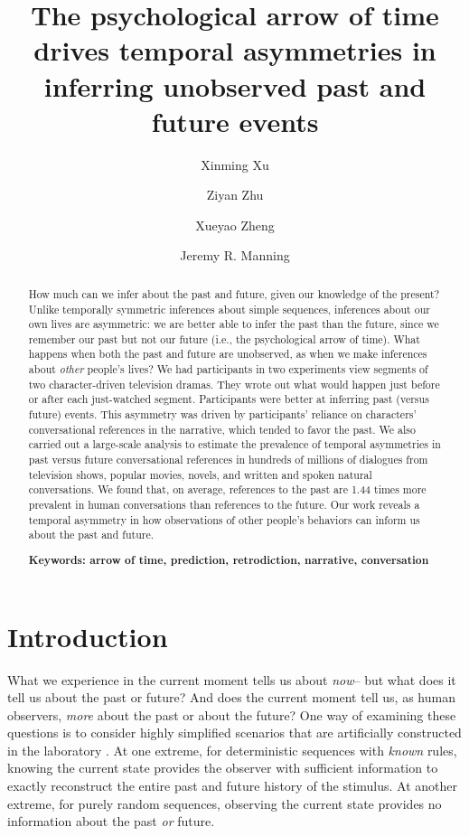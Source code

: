 \documentclass[10pt]{article}
\title{\Large The psychological arrow of time drives temporal asymmetries in inferring unobserved past and future events}
\author[1]{Xinming Xu}
\author[2]{Ziyan Zhu}
\author[3]{Xueyao Zheng}
\author[1, $\star$]{Jeremy R. Manning}
\affil[1]{Dartmouth College, Hanover, NH, USA}
\affil[2]{Peking University, Beijing, China}
\affil[3]{Beijing Normal University, Beijing, China}
\affil[$\star$]{Address correspondence to jeremy.r.manning@dartmouth.edu}
\begin{document}
\maketitle

\begin{abstract} {\footnotesize{ How much can we infer about the past and future, given our knowledge of the present? Unlike temporally symmetric inferences about simple sequences, inferences about our own lives are asymmetric: we are better able to infer the past than the future, since we remember our past but not our future (i.e., the psychological arrow of time). What happens when both the past and future are unobserved, as when we make inferences about \textit{other} people's lives? We had participants in two experiments view segments of two character-driven television dramas. They wrote out what would happen just before or after each just-watched segment. Participants were better at inferring past (versus future) events. This asymmetry was driven by participants’ reliance on characters’ conversational references in the narrative, which tended to favor the past. We also carried out a large-scale analysis to estimate the prevalence of temporal asymmetries in past versus future conversational references in hundreds of millions of dialogues from television shows, popular movies, novels, and written and spoken natural conversations. We found that, on average, references to the past are 1.44 times more prevalent in human conversations than references to the future. Our work reveals a temporal asymmetry in how observations of other people’s behaviors can inform us about the past and future.

\textbf{Keywords: arrow of time, prediction, retrodiction, narrative, conversation}}}

\end{abstract}

\section*{Introduction}
What we experience in the current moment tells us about \textit{now}-- but what does it tell us about the past or future? And does the current moment tell us, as human observers, \textit{more} about the past or about the future? One way of examining these questions is to consider highly simplified scenarios that are artificially constructed in the laboratory \citep[e.g., ][]{MaheEtal22}. At one extreme, for deterministic sequences with \textit{known} rules, knowing the current state provides the observer with sufficient information to exactly reconstruct the entire past and future history of the stimulus. At another extreme, for purely random sequences, observing the current state provides no information about the past \textit{or} future.
\end{document}
